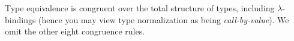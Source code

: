 \documentclass[authoryear, acmsmall, screen, review, nonacm]{acmart}
\begin{document}
\begin{code}%
\>[0]\AgdaSpace{}%
\AgdaSpace{}%
\<%
\\
\>[0][@{}l@{\AgdaIndent{0}}]%
\>[2]\AgdaSpace{}%
\AgdaSymbol{:}\<%
\\
\>[2][@{}l@{\AgdaIndent{0}}]%
\>[4]\AgdaSpace{}%
\AgdaSpace{}%
\<%
\\
%
\\[\AgdaEmptyExtraSkip]%
%
\>[2]\AgdaSpace{}%
\AgdaSymbol{:}\<%
\\
\>[2][@{}l@{\AgdaIndent{0}}]%
\>[4]\AgdaSpace{}%
\AgdaSpace{}%
\AgdaSpace{}%
\<%
\\
%
\>[4]\AgdaSpace{}%
\AgdaSpace{}%
\<%
\\
%
\\[\AgdaEmptyExtraSkip]%
%
\>[2]\AgdaSpace{}%
\AgdaSymbol{:}\<%
\\
\>[2][@{}l@{\AgdaIndent{0}}]%
\>[4]\AgdaSpace{}%
\AgdaSpace{}%
\AgdaSpace{}%
\AgdaSpace{}%
\AgdaSpace{}%
\AgdaSpace{}%
\AgdaSpace{}%
\<%
\\
%
\>[4]\AgdaSpace{}%
\AgdaSpace{}%
\<%
\end{code}

Type equivalence is congruent over the total structure of types, including $\lambda$-bindings (hence you may view type normalization as being \emph{call-by-value}). We omit the other eight congruence rules.
\end{document}
